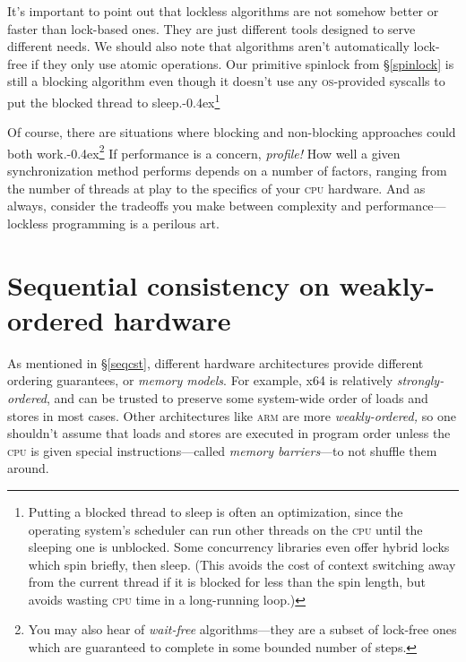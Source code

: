 \documentclass[fontsize=10pt, numbers=endperiod]{scrartcl}
\newcommand{\punckern}{\kern-0.4ex}
\newcommand{\introduce}[1]{\textit{#1}}
\newcommand{\secref}[1]{\hyperref[#1]{\textsc{\S}\ref*{#1}}}
\begin{document}
\begin{multicols*}{2}
It's important to point out that lockless algorithms are not somehow better
or faster than lock-based ones.
They are just different tools designed to serve different needs.
We should also note that algorithms aren't automatically lock-free if
they only use atomic operations.
Our primitive spinlock from \secref{spinlock} is still a blocking
algorithm even though it doesn't use any \textsc{os}-provided syscalls to
put the blocked thread to sleep.\punckern\footnote{Putting a blocked thread
to sleep is often an optimization,
since the operating system's scheduler can run other threads on the \textsc{cpu}
until the sleeping one is unblocked.
Some concurrency libraries even offer hybrid locks which spin briefly,
then sleep.
(This avoids the cost of context switching away from the current thread if it
is blocked for less than the spin length, but avoids wasting \textsc{cpu}
time in a long-running loop.)}

Of course, there are situations where blocking
and non-blocking approaches could both work.\punckern\footnote{You
may also hear of \introduce{wait-free} algorithms---they are a subset of
lock-free ones which are guaranteed to complete in some
bounded number of steps.}
If performance is a concern, \emph{profile!}
How well a given synchronization method performs depends on a number of factors,
ranging from the number of threads at
play to the specifics of your \textsc{cpu} hardware.
And as always, consider the tradeoffs you make between
complexity and performance---lockless programming is a perilous art.

\section{Sequential consistency on weakly-ordered hardware}

As mentioned in \secref{seqcst}, different hardware architectures
provide different ordering guarantees, or \introduce{memory models}.
For example, x64 is relatively \introduce{strongly-ordered},
and can be trusted to preserve some system-wide order of
loads and stores in most cases.
Other architectures like \textsc{arm} are more \introduce{weakly-ordered,}
so one shouldn't assume that loads and stores are executed in
program order unless the \textsc{cpu} is given special instructions---called
\introduce{memory barriers}---to not shuffle them around.


\end{multicols*}
\end{document}
